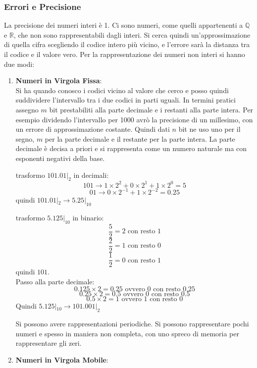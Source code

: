 \documentclass[a4paper,12pt, oneside]{book}
\begin{document}
\subsubsection{Errori e Precisione}
La precisione dei numeri interi è 1. Ci sono numeri, come quelli appartenenti a $\mathbb{Q}$ e $\mathbb{R}$, che non sono rappresentabili dagli interi. Si cerca quindi un'approssimazione di quella cifra scegliendo il codice intero più vicino, e l'errore sarà la distanza tra il codice e il valore vero.
Per la rappresentazione dei numeri non interi si hanno due modi:
\begin{enumerate}
  \item \textbf{Numeri in Virgola Fissa}:\\
  Si ha quando conosco i codici vicino al valore che cerco e posso quindi suddividere l'intervallo tra i due codici in parti uguali. In termini pratici assegno $m$ bit prestabiliti alla parte decimale e i restanti alla parte intera. Per esempio dividendo l'intervallo per 1000 avrò la precisione di un millesimo, con un errore di approssimazione costante. Quindi dati $n$ bit ne uso uno per il segno, $m$ per la parte decimale e il restante per la parte intera. La parte decimale è decisa a priori e si rappresenta come un numero naturale ma con esponenti negativi della base.
  \begin{esempio}
    trasformo $101.01|_{2}$ in decimali:\\
    $$101 \rightarrow 1\times 2^2+ 0\times 2^1+1 \times 2^0=5$$
    $$01\rightarrow 0\times 2^{-1}+1\times 2^{-2}=0.25$$
    quindi $101.01|_{2}\rightarrow 5.25|_{10}$
  \end{esempio}
  \begin{esempio}
    trasformo $5.125|_{10}$ in binario:\\
    $$\frac{5}{2}=2 \mbox{ con resto } 1$$
    $$\frac{2}{2}=1 \mbox{ con resto } 0$$
    $$\frac{1}{2}=0 \mbox{ con resto } 1$$
    quindi $101$.\\
    Passo alla parte decimale:\\
    $$0.125\times 2 = 0.25 \mbox{ ovvero } 0 \mbox{ con resto } 0.25$$
    $$0.25\times 2 = 0.5 \mbox{ ovvero } 0 \mbox{ con resto } 0.5$$
    $$0.5\times 2 = 1 \mbox{ ovvero } 1 \mbox{ con resto } 0$$
    Quindi $5.125|_{10}\rightarrow 101.001|_{2}$
  \end{esempio}
  Si possono avere rappresentazioni periodiche. Si possono rappresentare pochi numeri e spesso in maniera non completa, con uno spreco di memoria per rappresentare gli zeri.
  \item \textbf{Numeri in Virgola Mobile}:\\

\end{enumerate}
\end{document}
